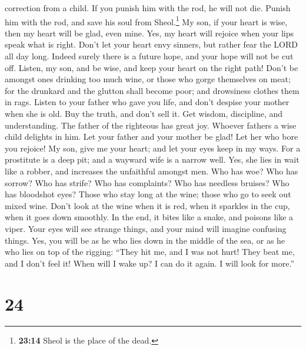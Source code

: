correction from a child. If you punish him with the rod, he will not
die.  Punish him with the rod, and save his soul from
Sheol.\footnote{\textbf{23:14} Sheol is the place of the dead.}
 My son, if your heart is wise, then my heart will be
glad, even mine.  Yes, my heart will rejoice when your
lips speak what is right.  Don't let your heart envy
sinners, but rather fear the LORD all day long.  Indeed
surely there is a future hope, and your hope will not be cut off.
 Listen, my son, and be wise, and keep your heart on the
right path!  Don't be amongst ones drinking too much
wine, or those who gorge themselves on meat;  for the
drunkard and the glutton shall become poor; and drowsiness clothes them
in rags.  Listen to your father who gave you life, and
don't despise your mother when she is old.  Buy the
truth, and don't sell it. Get wisdom, discipline, and understanding.
 The father of the righteous has great joy. Whoever
fathers a wise child delights in him.  Let your father
and your mother be glad! Let her who bore you rejoice! 
My son, give me your heart; and let your eyes keep in my ways.
 For a prostitute is a deep pit; and a wayward wife is a
narrow well.  Yes, she lies in wait like a robber, and
increases the unfaithful amongst men.  Who has woe? Who
has sorrow? Who has strife? Who has complaints? Who has needless
bruises? Who has bloodshot eyes?  Those who stay long at
the wine; those who go to seek out mixed wine.  Don't
look at the wine when it is red, when it sparkles in the cup, when it
goes down smoothly.  In the end, it bites like a snake,
and poisons like a viper.  Your eyes will see strange
things, and your mind will imagine confusing things. 
Yes, you will be as he who lies down in the middle of the sea, or as he
who lies on top of the rigging:  ``They hit me, and I was
not hurt! They beat me, and I don't feel it! When will I wake up? I can
do it again. I will look for more.''

\hypertarget{section-19}{%
\section{24}\label{section-19}}

